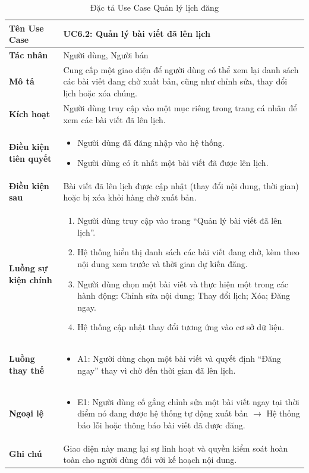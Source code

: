 \begin{table}[H]
\centering
\begin{tabularx}{\textwidth}{|l|X|}
\hline
\textbf{Tên Use Case} & \textbf{UC6.2: Quản lý bài viết đã lên lịch} \\ \hline
\textbf{Tác nhân} & Người dùng, Người bán \\ \hline
\textbf{Mô tả} & Cung cấp một giao diện để người dùng có thể xem lại danh sách các bài viết đang chờ xuất bản, cũng như chỉnh sửa, thay đổi lịch hoặc xóa chúng. \\ \hline
\textbf{Kích hoạt} & Người dùng truy cập vào một mục riêng trong trang cá nhân để xem các bài viết đã lên lịch. \\ \hline
\textbf{Điều kiện tiên quyết} & 
\begin{itemize}
    \item Người dùng đã đăng nhập vào hệ thống.
    \item Người dùng có ít nhất một bài viết đã được lên lịch.
\end{itemize} \\ \hline
\textbf{Điều kiện sau} & Bài viết đã lên lịch được cập nhật (thay đổi nội dung, thời gian) hoặc bị xóa khỏi hàng chờ xuất bản. \\ \hline
\textbf{Luồng sự kiện chính} & 
\begin{enumerate}
    \item Người dùng truy cập vào trang ``Quản lý bài viết đã lên lịch''.
    \item Hệ thống hiển thị danh sách các bài viết đang chờ, kèm theo nội dung xem trước và thời gian dự kiến đăng.
    \item Người dùng chọn một bài viết và thực hiện một trong các hành động: Chỉnh sửa nội dung; Thay đổi lịch; Xóa; Đăng ngay.
    \item Hệ thống cập nhật thay đổi tương ứng vào cơ sở dữ liệu.
\end{enumerate} \\ \hline
\textbf{Luồng thay thế} & 
\begin{itemize}
    \item A1: Người dùng chọn một bài viết và quyết định ``Đăng ngay'' thay vì chờ đến thời gian đã lên lịch.
\end{itemize} \\ \hline
\textbf{Ngoại lệ} & 
\begin{itemize}
    \item E1: Người dùng cố gắng chỉnh sửa một bài viết ngay tại thời điểm nó đang được hệ thống tự động xuất bản $\rightarrow$ Hệ thống báo lỗi hoặc thông báo bài viết đã được đăng.
\end{itemize} \\ \hline
\textbf{Ghi chú} & Giao diện này mang lại sự linh hoạt và quyền kiểm soát hoàn toàn cho người dùng đối với kế hoạch nội dung. \\ \hline
\end{tabularx}
\caption{Đặc tả Use Case Quản lý lịch đăng}
\end{table}